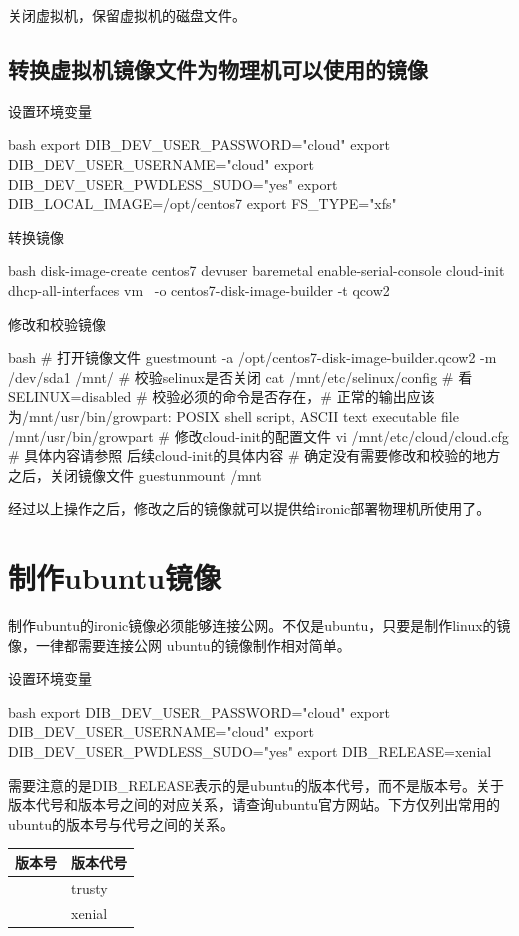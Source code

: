 关闭虚拟机，保留虚拟机的磁盘文件。

\subsection{转换虚拟机镜像文件为物理机可以使用的镜像}

设置环境变量
\begin{code-block}{bash}
export DIB_DEV_USER_PASSWORD="cloud"
export DIB_DEV_USER_USERNAME="cloud"
export DIB_DEV_USER_PWDLESS_SUDO="yes"
export DIB_LOCAL_IMAGE=/opt/centos7
export FS_TYPE="xfs"
\end{code-block}

转换镜像
\begin{code-block}{bash}
disk-image-create centos7 devuser baremetal enable-serial-console cloud-init dhcp-all-interfaces vm \
        -o centos7-disk-image-builder -t qcow2
\end{code-block}

修改和校验镜像
\begin{code-block}{bash}
# 打开镜像文件
guestmount -a /opt/centos7-disk-image-builder.qcow2 -m /dev/sda1 /mnt/
# 校验selinux是否关闭
cat /mnt/etc/selinux/config # 看SELINUX=disabled
# 校验必须的命令是否存在，# 正常的输出应该为/mnt/usr/bin/growpart: POSIX shell script, ASCII text executable
file /mnt/usr/bin/growpart
# 修改cloud-init的配置文件
vi /mnt/etc/cloud/cloud.cfg
# 具体内容请参照 后续cloud-init的具体内容
# 确定没有需要修改和校验的地方之后，关闭镜像文件
guestunmount /mnt
\end{code-block}

经过以上操作之后，修改之后的镜像就可以提供给ironic部署物理机所使用了。

\section{制作ubuntu镜像}
制作ubuntu的ironic镜像必须能够连接公网。不仅是ubuntu，只要是制作linux的镜像，一律都需要连接公网
ubuntu的镜像制作相对简单。

设置环境变量
\begin{code-block}{bash}
export DIB_DEV_USER_PASSWORD="cloud"
export DIB_DEV_USER_USERNAME="cloud"
export DIB_DEV_USER_PWDLESS_SUDO="yes"
export DIB_RELEASE=xenial
\end{code-block}

需要注意的是DIB\_RELEASE表示的是ubuntu的版本代号，而不是版本号。关于版本代号和版本号之间的对应关系，请查询ubuntu官方网站。下方仅列出常用的ubuntu的版本号与代号之间的关系。
\begin{center}
  \label{tab:ubuntu_edition_code}
  \begin{tabularx}{0.5\textwidth}{|X|X|}
  \hline
  \centering 版本号& \centering\arraybackslash 版本代号\\ \hline
  \centering 14.04 & \centering\arraybackslash trusty \\
  \centering 16.04 & \centering\arraybackslash xenial \\
  \hline
  \end{tabularx}
\end{center}

